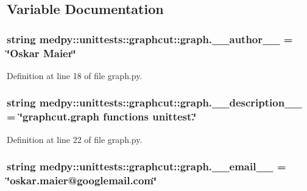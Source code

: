 \subsection{Variable Documentation}
\hypertarget{namespacemedpy_1_1unittests_1_1graphcut_1_1graph_a0f4197b3549889b9e20536ac3e94ad01}{
\subsubsection[{\_\-\_\-author\_\-\_\-}]{\setlength{\rightskip}{0pt plus 5cm}string {\bf medpy::unittests::graphcut::graph.\_\-\_\-author\_\-\_\-} = \char`\"{}Oskar Maier\char`\"{}}}
\label{namespacemedpy_1_1unittests_1_1graphcut_1_1graph_a0f4197b3549889b9e20536ac3e94ad01}


Definition at line 18 of file graph.py.

\hypertarget{namespacemedpy_1_1unittests_1_1graphcut_1_1graph_ab710730d849c9bc9ac28f4f0846cb982}{
\subsubsection[{\_\-\_\-description\_\-\_\-}]{\setlength{\rightskip}{0pt plus 5cm}string {\bf medpy::unittests::graphcut::graph.\_\-\_\-description\_\-\_\-} = \char`\"{}graphcut.graph functions unittest.\char`\"{}}}
\label{namespacemedpy_1_1unittests_1_1graphcut_1_1graph_ab710730d849c9bc9ac28f4f0846cb982}


Definition at line 22 of file graph.py.

\hypertarget{namespacemedpy_1_1unittests_1_1graphcut_1_1graph_a6a06490dea4aa5bb6338eceff5bad4d2}{
\subsubsection[{\_\-\_\-email\_\-\_\-}]{\setlength{\rightskip}{0pt plus 5cm}string {\bf medpy::unittests::graphcut::graph.\_\-\_\-email\_\-\_\-} = \char`\"{}oskar.maier@googlemail.com\char`\"{}}}
\label{namespacemedpy_1_1unittests_1_1graphcut_1_1graph_a6a06490dea4aa5bb6338eceff5bad4d2}



